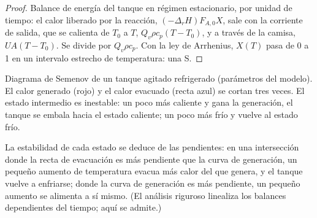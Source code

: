 \begin{proof}
Balance de energía del tanque en régimen estacionario, por unidad de tiempo: el calor
liberado por la reacción, $(-\Delta_r H)F_{A,0}X$, sale con la corriente de
salida, que se calienta de $T_0$ a $T$, $Q_v\rho c_p(T - T_0)$, y a través de
la camisa, $UA(T - T_0)$. Se divide por $Q_v\rho c_p$. Con la ley de Arrhenius,
$X(T)$ pasa de 0 a 1 en un intervalo estrecho de temperatura: una S.
\end{proof}

\begin{omfigure}

{\small Diagrama de Semenov de un tanque agitado refrigerado (parámetros del modelo). El
calor generado (rojo) y el calor evacuado (recta azul) se cortan tres veces. El
estado intermedio es inestable: un poco más caliente y gana la generación, el tanque
se embala hacia el estado caliente; un poco más frío y vuelve al estado
frío.}
\end{omfigure}

La estabilidad de cada estado se deduce de las pendientes: en una intersección
donde la recta de evacuación es más pendiente que la curva de generación, un pequeño aumento de
temperatura evacua más calor del que genera, y el tanque vuelve a enfriarse;
donde la curva de generación es más pendiente, un pequeño aumento se alimenta a sí mismo. (El
análisis riguroso linealiza los balances dependientes del tiempo; aquí se
admite.)


